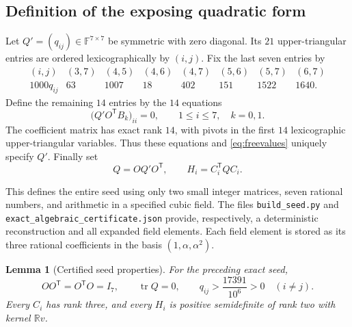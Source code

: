 \documentclass[11pt]{article}
\newtheorem{lemma}[theorem]{Lemma}
\theoremstyle{definition}
\newcommand{\R}{\mathbb R}
\newcommand{\F}{\mathbb F}
\newcommand{\tr}{\operatorname{tr}}
\newcommand{\trans}{^{\mathsf T}}
\numberwithin{equation}{section}
\begin{document}
\subsection{Definition of the exposing quadratic form}
Let $Q'=(q_{ij})\in\F^{7\times7}$ be symmetric with zero diagonal. Its
$21$ upper-triangular entries are ordered lexicographically by $(i,j)$.
Fix the last seven entries by
\begin{equation}\label{eq:freevalues}
 \begin{array}{c|rrrrrrr}
 (i,j)&(3,7)&(4,5)&(4,6)&(4,7)&(5,6)&(5,7)&(6,7)\\ \hline
 1000q_{ij}&63&1007&18&402&151&1522&1640.
 \end{array}
\end{equation}
Define the remaining $14$ entries by the $14$ equations
\begin{equation}\label{eq:tangentlinear}
 \bigl(Q'O\trans B_k\bigr)_{ii}=0,
 \qquad 1\leq i\leq7,\quad k=0,1.
\end{equation}
The coefficient matrix has exact rank $14$, with pivots in the first $14$
lexicographic upper-triangular variables. Thus these equations and
\eqref{eq:freevalues} uniquely specify $Q'$. Finally set
\begin{equation}\label{eq:Q}
 Q=OQ'O\trans,\qquad H_i=C_i\trans QC_i.
\end{equation}

This defines the entire seed using only two small integer matrices, seven
rational numbers, and arithmetic in a specified cubic field. The files
\texttt{build\_seed.py} and \texttt{exact\_algebraic\_certificate.json}
provide, respectively, a deterministic reconstruction and all expanded
field elements. Each field element is stored as its three rational
coefficients in the basis $(1,\alpha,\alpha^2)$.

\begin{lemma}[Certified seed properties]\label{lem:seed}
For the preceding exact seed,
\begin{equation}\label{eq:seedproperties}
 OO\trans=O\trans O=I_7,\qquad \tr Q=0,
 \qquad q_{ij}>\frac{17391}{10^6}>0\quad(i\ne j).
\end{equation}
Every $C_i$ has rank three, and every $H_i$ is positive semidefinite of
rank two with kernel $\R v$.
\end{lemma}
\end{document}

